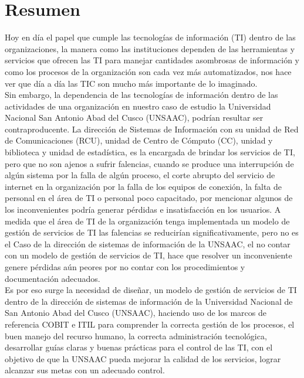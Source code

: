 \chapter*{Resumen}
Hoy en día el papel que cumple las tecnologías de información (TI) dentro de las organizaciones, la manera como las instituciones dependen de las herramientas y servicios que ofrecen las TI para manejar cantidades asombrosas de información y como los procesos de la organización son cada vez más automatizados, nos hace ver que día a día las TIC son mucho más importante de lo imaginado.\\ 
Sin embargo, la dependencia de las tecnologías de información dentro de las actividades de una organización en nuestro caso de estudio la Universidad Nacional San Antonio Abad del Cusco (UNSAAC), podrían resultar ser contraproducente. La dirección de Sistemas de Información con su unidad de Red de Comunicaciones (RCU), unidad de Centro de Cómputo (CC), unidad y biblioteca y unidad de estadística, es la encargada de brindar los servicios de TI, pero que no son ajenos a sufrir falencias, cuando se produce una interrupción de algún sistema por la falla de algún proceso, el corte abrupto del servicio de internet en la organización por la falla de los equipos de conexión, la falta de personal en el área de TI o personal poco capacitado, por mencionar algunos de los inconvenientes podría generar pérdidas e insatisfacción en los usuarios. A medida que el área de TI de la organización tenga implementada un modelo de gestión de servicios de TI las falencias se reducirían significativamente, pero no es el Caso de la dirección de sistemas de información de la UNSAAC, el no contar con un modelo de gestión de servicios de TI, hace que resolver un inconveniente genere pérdidas aún peores por no contar con los procedimientos y documentación adecuados.\\
Es por eso surge la necesidad de diseñar, un modelo de gestión de servicios de TI dentro de la dirección de sistemas de información de la Universidad Nacional de San Antonio Abad del Cusco (UNSAAC), haciendo uso de los marcos de referencia COBIT e ITIL para comprender la correcta gestión de los procesos, el buen manejo del recurso humano, la correcta administración tecnológica, desarrollar guías claras y buenas prácticas para el control de las TI, con el objetivo de que la UNSAAC  pueda mejorar la calidad de los servicios, lograr alcanzar sus metas con un adecuado control.